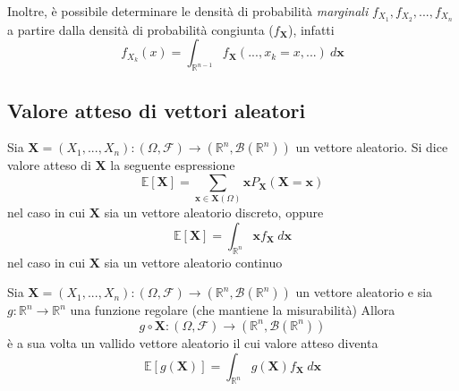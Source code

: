 \documentclass{article}
\begin{document}
            Inoltre, è possibile determinare le densità di probabilità \textit{marginali} $f_{X_{1}}, f_{X_{2}}, ..., f_{X_{n}}$ a partire dalla densità di probabilità congiunta ($f_{\mathbf{X}}$), infatti
            \[
                f_{X_{k}}(x) = \int_{\mathbb{R}^{n - 1}} f_{\mathbf{X}}(..., x_{k} = x, ...) \: d\mathbf{x}
            \]

        \subsection{Valore atteso di vettori aleatori}
            Sia $\mathbf{X} = (X_{1}, ..., X_{n}): (\Omega, \mathcal{F}) \rightarrow (\mathbb{R}^{n}, \mathcal{B}(\mathbb{R}^{n}))$ un vettore aleatorio.
            Si dice valore atteso di $\mathbf{X}$ la seguente espressione
            \[
                \mathbb{E}[\mathbf{X}] = \sum_{\mathbf{x} \in \mathbf{X}(\Omega)} \mathbf{x} P_{\mathbf{X}}(\mathbf{X} = \mathbf{x})
            \]
            nel caso in cui $\mathbf{X}$ sia un vettore aleatorio discreto, oppure
            \[
                \mathbb{E}[\mathbf{X}] = \int_{\mathbb{R}^{n}} \mathbf{x} f_{\mathbf{X}} \: d\mathbf{x}
            \]
            nel caso in cui $\mathbf{X}$ sia un vettore aleatorio continuo


            \vspace{10pt}
            Sia $\mathbf{X} = (X_{1}, ..., X_{n}): (\Omega, \mathcal{F}) \rightarrow (\mathbb{R}^{n}, \mathcal{B}(\mathbb{R}^{n}))$ un vettore aleatorio e sia $g: \mathbb{R}^{n} \rightarrow \mathbb{R}^{n}$ una funzione regolare (che mantiene la misurabilità)
            Allora
            \[
                g \circ \mathbf{X} : (\Omega, \mathcal{F}) \rightarrow (\mathbb{R}^{n}, \mathcal{B}(\mathbb{R}^{n}))
            \]
            è a sua volta un vallido vettore aleatorio il cui valore atteso diventa
            \[
                \mathbb{E}[g(\mathbf{X})] = \int_{\mathbb{R}^{n}} g(\mathbf{X}) f_{\mathbf{X}} \: d\mathbf{x}
            \]
\end{document}
